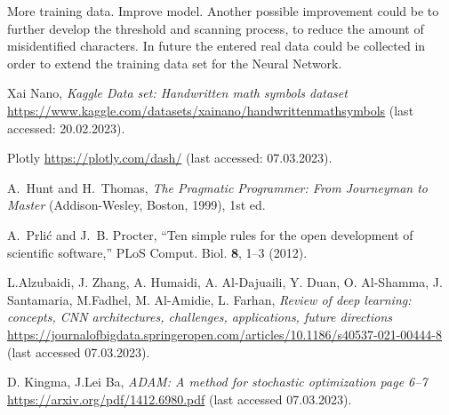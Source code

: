 \documentclass[@CLASSOPTIONS@]{tumarticle}
\begin{document}
More training data.
Improve model.
Another possible improvement could be to further develop the threshold and scanning process,
to reduce the amount of misidentified characters.
In future the entered real data could be collected in order to extend the training data set for the
Neural Network.

\begin{thebibliography}{10}
  \newcommand{\enquote}[1]{``#1''}

  Xai Nano, \emph{Kaggle Data set: Handwritten math symbols dataset}
  \url{https://www.kaggle.com/datasets/xainano/handwrittenmathsymbols}
  (last accessed: 20.02.2023).

  Plotly \url{https://plotly.com/dash/}
  (last accessed: 07.03.2023).

  A.~Hunt and H.~Thomas, \emph{The Pragmatic Programmer: From Journeyman to
    Master} (Addison-Wesley, Boston, 1999), 1st ed.

  A.~Prli{\'c} and J.~B. Procter, \enquote{Ten simple rules for the open
    development of scientific software,} PLoS Comput. Biol. \textbf{8}, 1--3
  (2012).

  L.Alzubaidi, J. Zhang, A. Humaidi, A. Al-Dajuaili, Y. Duan, O. Al-Shamma, J. Santamaria, M.Fadhel, M. Al-Amidie, L. Farhan,
    \emph{Review of deep learning: concepts, CNN architectures, challenges, applications, future directions}
    \url{https://journalofbigdata.springeropen.com/articles/10.1186/s40537-021-00444-8}
    (last accessed 07.03.2023).

  D. Kingma, J.Lei Ba, \emph{ADAM: A method for stochastic optimization page 6--7}
    \url{https://arxiv.org/pdf/1412.6980.pdf}
        (last accessed 07.03.2023).

  \bibitem{}



\end{thebibliography}
\end{document}
